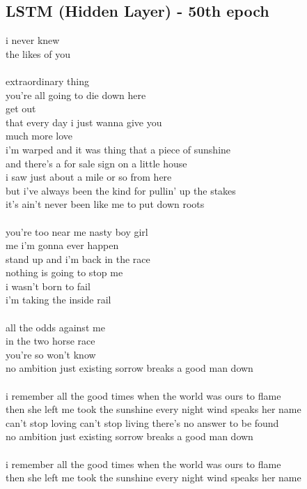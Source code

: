 \documentclass[conference]{IEEEtran}
\begin{document}
\subsection{LSTM (Hidden Layer) - 50th epoch}\label{HID50}
i never knew \\
the likes of you \\
\\
extraordinary thing \\
you're all going to die down here \\
get out \\
that every day i just wanna give you \\
much more love \\
i'm warped and it was thing that a piece of sunshine \\
and there's a for sale sign on a little house \\
i saw just about a mile or so from here \\
but i've always been the kind for pullin' up the stakes \\
it's ain't never been like me to put down roots \\
\\
you're too near me nasty boy girl \\
me i'm gonna ever happen \\
stand up and i'm back in the race \\
nothing is going to stop me \\
i wasn't born to fail \\
i'm taking the inside rail \\
\\
all the odds against me \\
in the two horse race \\
you're so won't know \\
no ambition just existing sorrow breaks a good man down \\
\\
i remember all the good times when the world was ours to flame \\
then she left me took the sunshine every night wind speaks her name \\
can't stop loving can't stop living there's no answer to be found \\
no ambition just existing sorrow breaks a good man down \\
\\
i remember all the good times when the world was ours to flame \\
then she left me took the sunshine every night wind speaks her name \\
\end{document}
